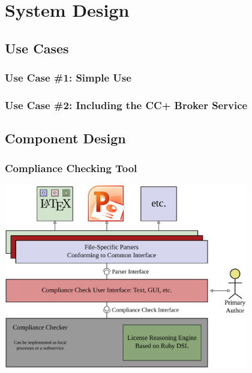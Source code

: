 \documentclass[mathserif,xcolor=dvipsnames,hyperref={bookmarks=true}]{beamer}
\begin{document}
\section{System Design}

    \subsection{Use Cases}

    \begin{frame}[t]
        \frametitle{Use Case \#1: Simple Use}
        \begin{center}
        \end{center}
    \end{frame}

    \begin{frame}[t]
        \frametitle{Use Case \#2: Including the CC+ Broker Service}
        \begin{center}
        \end{center}
    \end{frame}

    \subsection{Component Design}

    \begin{frame}[t]
        \frametitle{Compliance Checking Tool}
        \begin{center}
            \includegraphics[width=0.8\textwidth]{compliance-checking-tool.pdf}
        \end{center}
    \end{frame}
\end{document}
